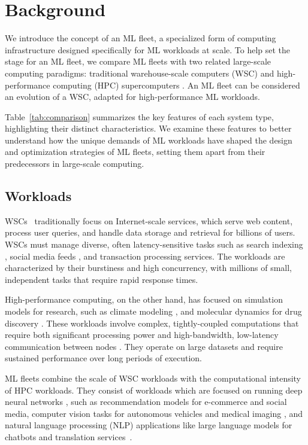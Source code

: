 \section{Background}\label{sec:background}

We introduce the concept of an ML fleet, a specialized form of computing infrastructure designed specifically for ML workloads at scale. To help set the stage for an ML fleet, we compare ML fleets with two related large-scale computing paradigms: traditional warehouse-scale computers (WSC) \cite{barroso2009wsc} and high-performance computing (HPC) supercomputers \cite{asanovic2009berkeleyview}. An ML fleet can be considered an evolution of a WSC, adapted for high-performance ML workloads. 

Table~\ref{tab:comparison} summarizes the key features of each system type, highlighting their distinct characteristics. We examine these features to better understand how the unique demands of ML workloads have shaped the design and optimization strategies of ML fleets, setting them apart from their predecessors in large-scale computing.
\subsection{Workloads}
WSCs~\cite{barroso2009wsc} traditionally focus on Internet-scale services, which serve web content, process user queries, and handle data storage and retrieval for billions of users. WSCs must manage diverse, often latency-sensitive tasks such as search indexing \cite{brin1998anatomy}, social media feeds \cite{nishtala2013memcache}, and transaction processing services. The workloads are characterized by their burstiness and high concurrency, with millions of small, independent tasks that require rapid response times.

High-performance computing, on the other hand, has focused on simulation models for research, such as climate modeling \cite{menemenlis2005nasa}, and molecular dynamics for drug discovery \cite{schulz2009scaling}. These workloads involve complex, tightly-coupled computations that require both significant processing power and high-bandwidth, low-latency communication between nodes \cite{stegailov2019angara}. They operate on large datasets and require sustained performance over long periods of execution.

ML fleets combine the scale of WSC workloads with the computational intensity of HPC workloads. They consist of workloads which are focused on running deep neural networks \cite{alexnet2012}, such as recommendation models \citep{naumov2019deeplearningrecommendationmodel,zhao2022understanding} for e-commerce and social media, computer vision tasks for autonomous vehicles \cite{janai2020computer} and medical imaging \cite{esteva2021deep}, and natural language processing (NLP) applications like large language models for chatbots and translation services~\cite{zhao2021understanding}. 


